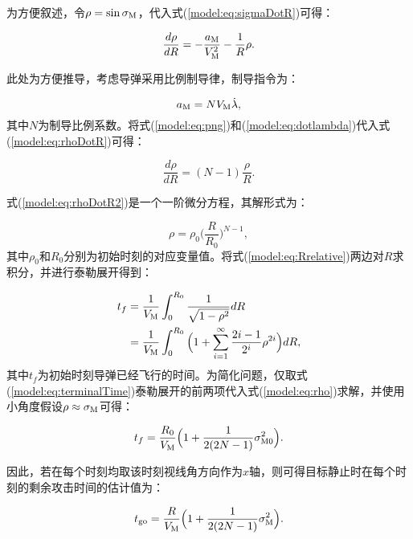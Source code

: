 为方便叙述，令$\rho=\sin{\sigma_{\text M}}$，代入式(\ref{model:eq:sigmaDotR})可得：

\begin{equation}
\label{model:eq:rhoDotR}
	\frac{d\rho}{dR} = -\frac{a_{\text M}}{V_{\text M}^2}-\frac{1}{R}\rho.
\end{equation}

此处为方便推导，考虑导弹采用比例制导律，制导指令为：

\begin{equation}
\label{model:eq:png}
	a_{\text M}=N V_{\text M} \dot{\lambda},
\end{equation}
其中$N$为制导比例系数。将式(\ref{model:eq:png})和(\ref{model:eq:dotlambda})代入式(\ref{model:eq:rhoDotR})可得：

\begin{equation}
\label{model:eq:rhoDotR2}
	\frac{d\rho}{dR} = (N-1)\frac{\rho}{R}.
\end{equation}

式(\ref{model:eq:rhoDotR2})是一个一阶微分方程，其解形式为：

\begin{equation}
\label{model:eq:rho}
	\rho=\rho_0 \Bigg(\frac{R}{R_0}\Bigg)^{N-1},
\end{equation}
其中$\rho_0$和$R_0$分别为初始时刻的对应变量值。将式(\ref{model:eq:Rrelative})两边对$R$求积分，并进行泰勒展开得到：

\begin{align}
\label{model:eq:terminalTime}
	t_f &= \frac{1}{V_{\text M}} \int_0^{R_0} \frac{1}{\sqrt{1-\rho^2}}dR \notag \\
	&= \frac{1}{V_{\text M}} \int_{0}^{R_0} \Big(1+\sum_{i=1}^{\infty} \frac{2i-1}{2^i}\rho^{2i} \Big)dR,
\end{align}
其中$t_f$为初始时刻导弹已经飞行的时间。为简化问题，仅取式(\ref{model:eq:terminalTime})泰勒展开的前两项代入式(\ref{model:eq:rho})求解，并使用小角度假设$\rho \approx \sigma_{\text M}$可得：

\begin{equation}
\label{model:eq:tfsolution}
	t_f = \frac{R_0}{V_{\text M}} \Big(1+\frac{1}{2(2N-1)}\sigma_{\text M0}^2 \Big).
\end{equation}

因此，若在每个时刻均取该时刻视线角方向作为$x$轴，则可得目标静止时在每个时刻的剩余攻击时间的估计值为：

\begin{equation}
\label{model:eq:stillTF}
	t_{\text{go}} = \frac{R}{V_{\text M}} \Big(1+\frac{1}{2(2N-1)}\sigma_{\text M}^2 \Big).
\end{equation}

